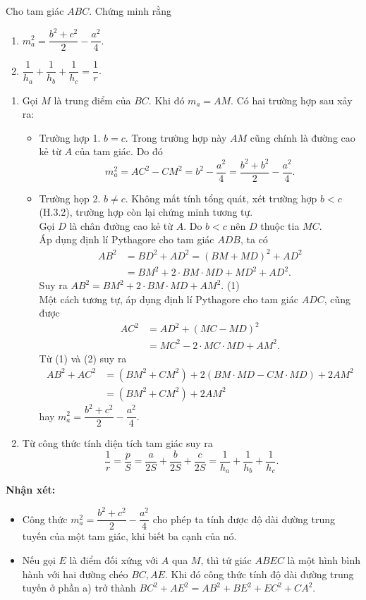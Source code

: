 \begin{bt}%
	Cho tam giác $ABC$. Chứng minh rằng
	\begin{enumerate}
		\item $m_a^2=\dfrac{b^2+c^2}{2}-\dfrac{a^2}{4}$.
		\item $\dfrac{1}{h_a}+\dfrac{1}{h_b}+\dfrac{1}{h_c}=\dfrac{1}{r}$.
	\end{enumerate}
	\loigiai
	{
	\begin{enumerate}
		\item Gọi $M$ là trung điểm của $BC$. Khi đó $m_a=AM$. Có hai trường hợp sau xảy ra:
		\begin{itemize}
			\item Trường hợp 1. $b=c$. Trong trường hợp này $AM$ cũng chính là đường cao kẻ từ $A$ của tam giác. Do đó $$m_a^2=AC^2-CM^2=b^2-\dfrac{a^2}{4}=\dfrac{b^2+b^2}{2}-\dfrac{a^2}{4}.$$
			\item Trường họp 2. $b\neq c$. Không mất tính tổng quát, xét trường hợp $b<c$ (H.3.2), trường hợp còn lại chứng minh tương tự.\\
			Gọi $D$ là chân đường cao kẻ từ $A$. Do $b<c$ nên $D$ thuộc tia $MC$.\\
			Áp dụng định lí Pythagore cho tam giác $ADB$, ta có
			$$
			\begin{aligned}
			AB^2&=BD^2+AD^2=(BM+MD)^2+AD^2\\
			&=BM^2+2\cdot BM\cdot MD+MD^2+AD^2.
			\end{aligned}$$
			Suy ra $AB^2=BM^2+2\cdot BM\cdot MD+AM^2$. \hfill (1)\\
			Một cách tương tự, áp dụng định lí Pythagore cho tam giác $ADC$, cũng được
			\allowdisplaybreaks
			\begin{align*}
				AC^2&=AD^2+(MC-MD)^2\\
				&=MC^2-2\cdot MC\cdot MD+AM^2 \tag{2}.
			\end{align*}
			Từ (1) và (2) suy ra
				$$
				\begin{aligned}
				AB^2+AC^2&=\left(BM^2+CM^2\right)+2(BM\cdot MD-CM\cdot MD)+2AM^2\\
				&=\left(BM^2+CM^2\right)+2AM^2
				\end{aligned}$$
			hay $m_a^2=\dfrac{b^2+c^2}{2}-\dfrac{a^2}{4}$.
		\end{itemize}
		\item Từ công thức tính diện tích tam giác suy ra
		$$\dfrac{1}{r}=\dfrac{p}{S}=\dfrac{a}{2S}+\dfrac{b}{2S}+\dfrac{c}{2S}=\dfrac{1}{h_a}+\dfrac{1}{h_b}+\dfrac{1}{h_c}.$$
	\end{enumerate}
	\textbf{Nhận xét:}
	\begin{itemize}
		\item Công thức $m_a^2=\dfrac{b^2+c^2}{2}-\dfrac{a^2}{4}$ cho phép ta tính được độ dài đường trung tuyến của một tam giác, khi biết ba cạnh của nó. 
		\item Nếu gọi $E$ là điểm đối xứng với $A$ qua $M$, thì tứ giác $ABEC$ là một hình bình hành với hai đường chéo $BC, AE$. Khi đó công thức tính độ dài đường trung tuyến ở phần a) trở thành $BC^2+AE^2=AB^2+BE^2+EC^2+CA^2$.
	\end{itemize}
	}
\end{bt}

